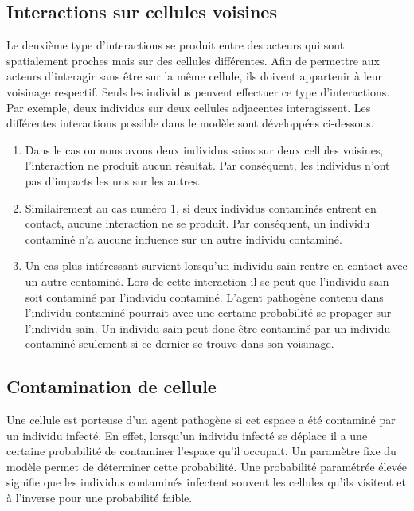 \subsection{Interactions sur cellules voisines}

Le deuxième type d'interactions se produit entre des acteurs qui sont spatialement proches mais sur des cellules différentes. Afin de permettre aux acteurs d'interagir sans être sur la même cellule, ils doivent appartenir à leur voisinage respectif. Seuls les individus peuvent effectuer ce type d'interactions. Par exemple, deux individus sur deux cellules adjacentes interagissent. Les différentes interactions possible dans le modèle sont développées ci-dessous.

\begin{enumerate}
	\item Dans le cas ou nous avons deux individus sains sur deux cellules voisines, l'interaction ne produit aucun résultat. Par conséquent, les individus n'ont pas d’impacts les uns sur les autres.
	\item Similairement au cas numéro $1$, si deux individus contaminés entrent en contact, aucune interaction ne se produit. Par conséquent, un individu contaminé n'a aucune influence sur un autre individu contaminé.
	\item Un cas plus intéressant survient lorsqu'un individu sain rentre en contact avec un autre contaminé. Lors de cette interaction il se peut que l'individu sain soit contaminé par l'individu contaminé. L'agent pathogène contenu dans l'individu contaminé pourrait avec une certaine probabilité se propager sur l'individu sain. Un individu sain peut donc être contaminé par un individu contaminé seulement si ce dernier se trouve dans son voisinage.
\end{enumerate}

\subsection{Contamination de cellule}

Une cellule est porteuse d'un agent pathogène si cet espace a été contaminé par un individu infecté. En effet, lorsqu’un individu infecté se déplace il a une certaine probabilité de contaminer l'espace qu'il occupait. Un paramètre fixe du modèle permet de déterminer cette probabilité. Une probabilité paramétrée élevée signifie que les individus contaminés infectent souvent les cellules qu'ils visitent et à l'inverse pour une probabilité faible.\\

